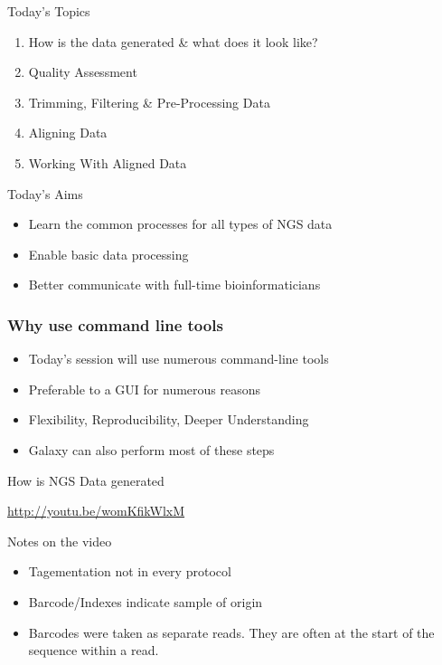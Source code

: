 \documentclass[11pt]{beamer}
\let\oldframetitle\frametitle%
\renewcommand{\frametitle}[1]{%
  \oldframetitle{#1}\setstretch{2}}
\begin{document}
\begin{frame}{Today's Topics}
	\begin{enumerate}
	\item How is the data generated \& what does it look like?
	\item Quality Assessment
	\item Trimming, Filtering \& Pre-Processing Data
	\item Aligning Data
	\item Working With Aligned Data
	\end{enumerate}
\end{frame}

\begin{frame}{Today's Aims}
\begin{itemize}
\item Learn the common processes for all types of NGS data
\item Enable basic data processing
\item Better communicate with full-time bioinformaticians
\end{itemize}
\end{frame}


\begin{frame}
\frametitle{Why use command line tools}
\begin{itemize}
\item Today's session will use numerous command-line tools
\item Preferable to a GUI for numerous reasons
\item Flexibility, Reproducibility, Deeper Understanding
\item Galaxy can also perform most of these steps
\end{itemize}
\end{frame}


\begin{frame}{How is NGS Data generated}

\url{http://youtu.be/womKfikWlxM}

\end{frame}

\begin{frame}{Notes on the video}
	\begin{itemize}
	\item Tagementation not in every protocol
	\item Barcode/Indexes indicate sample of origin
	\item Barcodes were taken as separate reads. They are often at the start of the sequence within a read.
	\end{itemize}
\end{frame}
\end{document}
